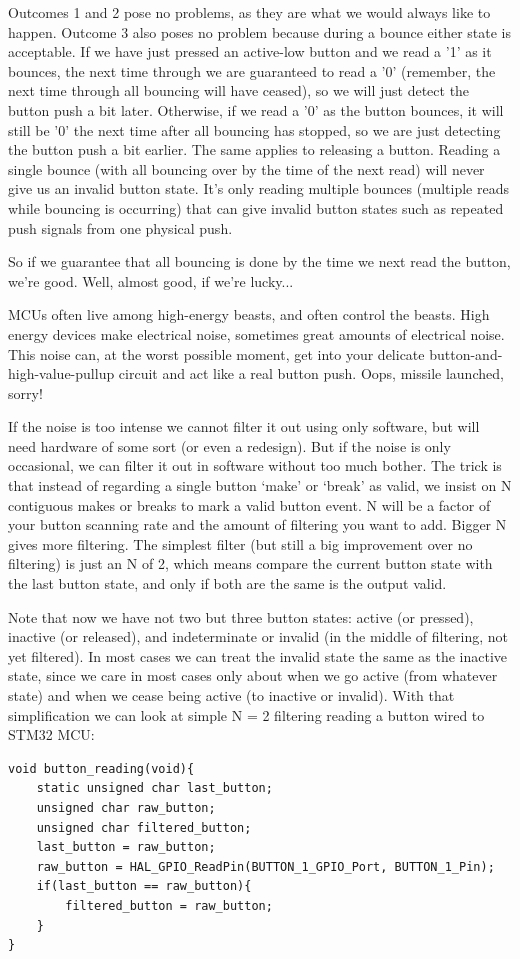 Outcomes 1 and 2 pose no problems, as they are what we would always like to happen.  Outcome 3 also poses no problem because during a bounce either state is acceptable.  If we have just pressed an active-low button and we read a '1' as it bounces, the next time through we are guaranteed to read a '0' (remember, the next time through all bouncing will have ceased), so we will just detect the button push a bit later.  Otherwise, if we read a '0' as the button bounces, it will still be '0' the next time after all bouncing has stopped, so we are just detecting the button push a bit earlier.  The same applies to releasing a button.  Reading a single bounce (with all bouncing over by the time of the next read) will never give us an invalid button state.  It's only reading multiple bounces (multiple reads while bouncing is occurring) that can give invalid button states such as repeated push signals from one physical push. 

So if we guarantee that all bouncing is done by the time we next read the button, we're good.  Well, almost good, if we're lucky...

MCUs often live among high-energy beasts, and often control the beasts.  High energy devices make electrical noise, sometimes great amounts of electrical noise.  This noise can, at the worst possible moment, get into your delicate button-and-high-value-pullup circuit and act like a real button push.  Oops, missile launched, sorry!

If the noise is too intense we cannot filter it out using only software, but will need hardware of some sort (or even a redesign).  But if the noise is only occasional, we can filter it out in software without too much bother.  The trick is that instead of regarding a single button `make' or `break' as valid, we insist on N contiguous makes or breaks to mark a valid button event.  N will be a factor of your button scanning rate and the amount of filtering you want to add.  Bigger N gives more filtering.  The simplest filter (but still a big improvement over no filtering) is just an N of 2, which means compare the current button state with the last button state, and only if both are the same is the output valid.

Note that now we have not two but three button states: active (or pressed), inactive (or released), and indeterminate or invalid (in the middle of filtering, not yet filtered).  In most cases we can treat the invalid state the same as the inactive state, since we care in most cases only about when we go active (from whatever state) and when we cease being active (to inactive or invalid).  With that simplification we can look at simple N = 2 filtering reading a button wired to STM32 MCU:
\begin{lstlisting}[caption=Read port pin and deboucing]
void button_reading(void){
    static unsigned char last_button;
    unsigned char raw_button;
    unsigned char filtered_button;
    last_button = raw_button;
    raw_button = HAL_GPIO_ReadPin(BUTTON_1_GPIO_Port, BUTTON_1_Pin);
    if(last_button == raw_button){
        filtered_button = raw_button;
    }
}
\end{lstlisting}

